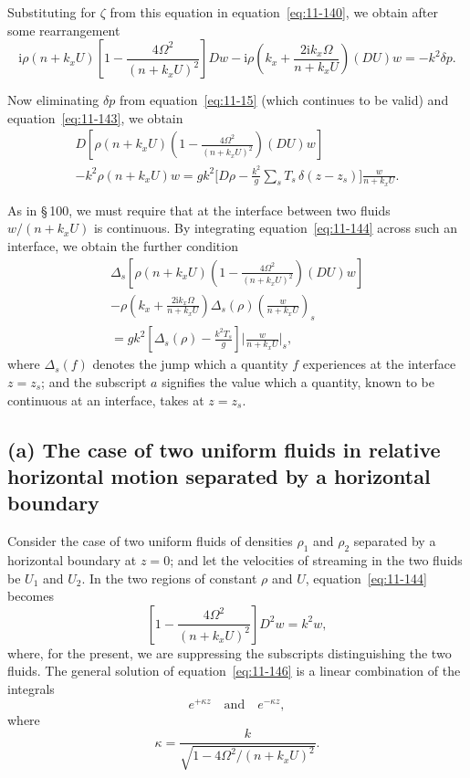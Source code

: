 Substituting for $\zeta$ from this equation in equation~\eqref{eq:11-140}, we obtain after some rearrangement
\begin{equation}
\label{eq:11-143}
\mathrm{i}\rho(n+k_x U)\!\left[1-\frac{4\Omega^2}{(n+k_x U)^2}\right]\!Dw - \mathrm{i}\rho\!\left(k_x+\frac{2\mathrm{i}k_x\Omega}{n+k_x U}\right)\!(DU)w = -k^2\delta p.
\end{equation}

Now eliminating $\delta p$ from equation~\eqref{eq:11-15} (which continues to be valid) and equation~\eqref{eq:11-143}, we obtain
\begin{multline}
\label{eq:11-144}
D\!\left[\rho(n+k_x U)\!\left(1-\frac{4\Omega^2}{(n+k_x U)^2}\right)\!(DU)w\right] \\
-k^2\rho(n+k_x U)w = gk^2\bigg[D\rho - \frac{k^2}{g}\sum_s T_s\,\delta(z-z_s)\bigg]\frac{w}{n+k_x U}.
\end{multline}

As in \S\,100, we must require that at the interface between two fluids $w/(n+k_x U)$ is continuous. By integrating equation~\eqref{eq:11-144} across such an interface, we obtain the further condition
\begin{multline}
\label{eq:11-145}
\Delta_s\!\left[\rho(n+k_x U)\!\left(1-\frac{4\Omega^2}{(n+k_x U)^2}\right)\!(DU)w\right] \\
- \rho\!\left(k_x+\frac{2\mathrm{i}k_x\Omega}{n+k_x U}\right)\!\Delta_s\!\left(\rho\right)\!\left(\frac{w}{n+k_x U}\right)_{s} \\
= gk^2\!\left[\Delta_s(\rho)-\frac{k^2 T_s}{g}\right]\!\bigg|_{}\frac{w}{n+k_x U}\bigg|_s\!,
\end{multline}
where $\Delta_s(f)$ denotes the jump which a quantity $f$ experiences at the interface $z = z_s$; and the subscript $a$ signifies the value which a quantity, known to be continuous at an interface, takes at $z = z_s$.

\subsection*{(a) The case of two uniform fluids in relative horizontal motion separated by a horizontal boundary}

Consider the case of two uniform fluids of densities $\rho_1$ and $\rho_2$ separated by a horizontal boundary at $z = 0$; and let the velocities of streaming in the two fluids be $U_1$ and $U_2$. In the two regions of constant $\rho$ and $U$, equation~\eqref{eq:11-144} becomes
\begin{equation}
\label{eq:11-146}
\left[1-\frac{4\Omega^2}{(n+k_x U)^2}\right]D^2w = k^2 w,
\end{equation}
where, for the present, we are suppressing the subscripts distinguishing the two fluids. The general solution of equation~\eqref{eq:11-146} is a linear combination of the integrals
\begin{equation}
\label{eq:11-147}
e^{+\kappa z} \quad\text{and}\quad e^{-\kappa z},
\end{equation}
where
\begin{equation}
\label{eq:11-148}
\kappa = \frac{k}{\sqrt{1-4\Omega^2/(n+k_x U)^2}}.
\end{equation}

